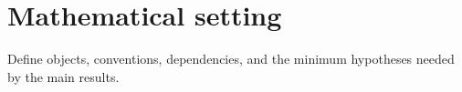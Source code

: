 \section{Mathematical setting}
Define objects, conventions, dependencies, and the minimum hypotheses needed by the main results.
